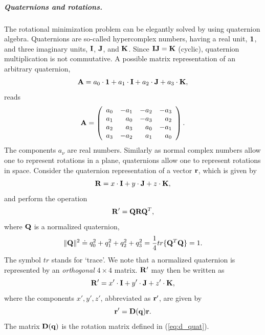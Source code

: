 \documentclass[a4paper,11pt]{article}
\begin{document}
\subparagraph{Quaternions and rotations.} The rotational minimization problem can be elegantly solved by using quaternion algebra.
Quaternions are so-called hypercomplex numbers, having a real unit, ${\bf 1}$, and three imaginary units, 
${\bf I}$, ${\bf J}$, and ${\bf K}$. Since ${\bf I}{\bf J} = {\bf K}$ (cyclic), quaternion multiplication is not commutative. 
A possible matrix representation of an arbitrary quaternion,
\begin{equation}
{\bf A} = a_0\cdot{\bf 1} + a_1\cdot{\bf I} + a_2\cdot{\bf J} + 
          a_3\cdot{\bf K},
\end{equation}
reads 
\begin{equation}
\label{eq:a_mat}
 {\bf A} = \left( \begin{array}{rrrr}
                  a_0 &-a_1 &-a_2 &-a_3 \\
                  a_1 & a_0 &-a_3 & a_2 \\
                  a_2 & a_3 & a_0 &-a_1 \\
                  a_3 &-a_2 & a_1 & a_0
                  \end{array} 
           \right).
\end{equation}
The components $a_\nu$ are real numbers. Similarly as normal complex numbers allow one to represent rotations in a plane, quaternions 
allow one to represent rotations in space. Consider the quaternion representation of a vector ${\bf r}$, which is given by 
\begin{equation}
{\bf R} = x\cdot{\bf I} + y\cdot{\bf J} + z\cdot{\bf K},
\end{equation}  
and perform the operation
\begin{equation}
{\bf R}' = {\bf Q}{\bf R}{\bf Q}^T,
\end{equation}  
where ${\bf Q}$ is a normalized quaternion,
\begin{equation}
\|{\bf Q}\|^2 \doteq
q_0^2 + q_1^2 + q_2^2 + q_3^2 = \frac{1}{4}tr\{{\bf Q}^T{\bf Q}\} = 1. 
\end{equation}
The symbol $tr$ stands for `trace'. We note that a normalized quaternion is represented by an {\em orthogonal} $4\times 4$ 
matrix. ${\bf R}'$ may then be written  as
\begin{equation}
{\bf R}' = x'\cdot{\bf I} + y'\cdot{\bf J} + z'\cdot{\bf K},
\end{equation}
where the components $x',y',z'$, abbreviated as ${\bf r}'$, are given by
\begin{equation}
{\bf r}' = {\bf D}({\bf q}){\bf r}.
\end{equation}
The matrix ${\bf D}({\bf q})$ is the rotation matrix defined in
(\ref{eq:d_quat}).
\end{document}
